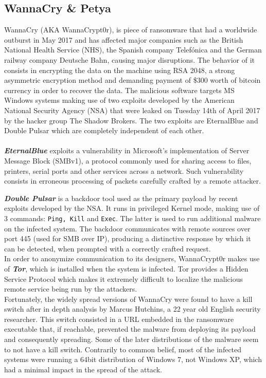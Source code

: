 \documentclass[10pt]{article}
\begin{document}
\subsection{WannaCry \& Petya}
WannaCry (AKA WannaCrypt0r), is piece of ransomware that had a worldwide outburst in May 2017 and has affected major companies such as the British National Health Service (NHS), the Spanish company Telefónica and the German railway company Deutsche Bahn, causing major disruptions. The behavior of it consists in encrypting the data on the machine using RSA 2048, a strong asymmetric encryption method and demanding payment of \$300 worth of bitcoin currency in order to recover the data. The malicious software targets MS Windows systems making use of two exploits developed by the American National Security Agency (NSA) that were leaked on Tuesday 14th of April 2017 by the hacker group The Shadow Brokers. The two exploits are EternalBlue and Double Pulsar which are completely independent of each other. \\ \\
\textbf{\textit{EternalBlue}} exploits a vulnerability in Microsoft's implementation of Server Message Block (SMBv1), a protocol commonly used for sharing access to files, printers, serial ports and other services across a network. Such vulnerability consists in erroneous processing of packets carefully crafted by a remote attacker. 

\noindent\textbf{\textit{Double Pulsar}} is a backdoor tool used as the primary payload by recent exploits developed by the NSA. It runs in privileged Kernel mode, making use of 3 commands: \texttt{Ping, Kill} and \texttt{Exec}. The latter is used to run additional malware on the infected system. The backdoor communicates with remote sources over port 445 (used for SMB over IP), producing a distinctive response by which it can be detected, when prompted with a correctly crafted request. \\

\noindent In order to anonymize communication to its designers, WannaCrypt0r makes use of \textit{\textbf{Tor}}, which is installed when the system is infected. Tor provides a Hidden Service Protocol which makes it extremely difficult to localize the malicious remote service being run by the attackers. \\
\noindent Fortunately, the widely spread versions of WannaCry were found to have a kill switch after in depth analysis by Marcus Hutchins, a 22 year old English security researcher. This switch consisted in a URL  embedded in the ransomware executable that, if reachable, prevented the malware from deploying its payload and consequently spreading. Some of the later distributions of the malware seem to not have a kill switch. Contrarily to common belief, most of the infected systems were running a 64bit distribution of Windows 7, not Windows XP, which had a minimal impact in the spread of the attack. \\
\end{document}

